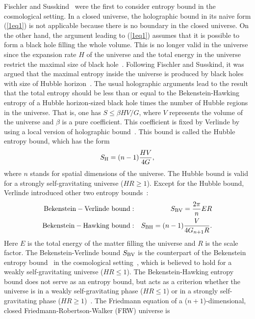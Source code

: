 \documentclass[a4paper,12pt]{article}
\begin{document}
Fischler and Susskind~\cite{FS} were the first to consider entropy bound in the cosmological
setting. In a closed universe, the holographic bound in its naive form (\ref{1eq1}) is not
applicable because there is no boundary in the closed universe. On the other hand, the
argument leading to (\ref{1eq1}) assumes that it is possible to form a black hole filling the
whole volume. This is no longer valid in  the universe since the expansion rate $H$ of the universe
and the total energy in the universe restrict the maximal size of black hole~\cite{Verl}. Following Fischler and Susskind, it was argued that the maximal entropy inside the
universe is produced by black holes with size of Hubble horizon~\cite{Hubb}. The usual
holographic arguments  lead to the result  that the total entropy should be less than or
equal to the
Bekenstein-Hawking entropy of a Hubble horizon-sized black hole times the number of Hubble
regions in the universe. That is,  one has $S \le \beta HV/G$, where $V$ represents the volume of
the universe and $\beta$ is a pure coefficient.
This coefficient is fixed by Verlinde \cite{Verl} by using a local version of holographic
bound~\cite{FS,Bous}. This bound is called the Hubble entropy bound, which has the form
\begin{equation}
\label{1eq2}
S_{\rm H}= (n-1) \frac{HV}{4G},
\end{equation}
where $n$ stands for spatial dimensions of the universe. The Hubble bound is valid
 for a strongly self-gravitating universe ($HR\ge 1$). Except for the Hubble bound,
 Verlinde introduced other two entropy bounds~\cite{Verl}:
\begin{eqnarray}
\label{1eq3}
 {\rm Bekenstein-Verlinde\ bound}:&& S_{\rm BV}=\frac{2\pi}{n}ER
   \nonumber \\
 {\rm Bekenstein-Hawking\ bound}:&& S_{\rm BH}=(n-1)\frac{V}{4G_{n+1}R}.
 \end{eqnarray}
Here $E$ is the total energy of the matter filling the universe and $R$ is the scale factor.
The Bekenstein-Verlinde bound $S_{\rm BV}$ is the counterpart of the Bekenstein entropy
bound~\cite{Beke} in the cosmological setting~\cite{CMO}, which is believed to hold
for a weakly
self-gravitating universe ($HR \le 1$).  The Bekenstein-Hawking entropy bound
does not serve as an entropy bound, but acts as a criterion whether the universe is in a
weakly self-gravitating phase ($HR \le 1$) or in a strongly self-gravitating phase
($HR \ge 1$)~\cite{Verl}.  The Friedmann
equation of a ($n+1$)-dimensional, closed Friedmann-Robertson-Walker (FRW) universe is
\end{document}
